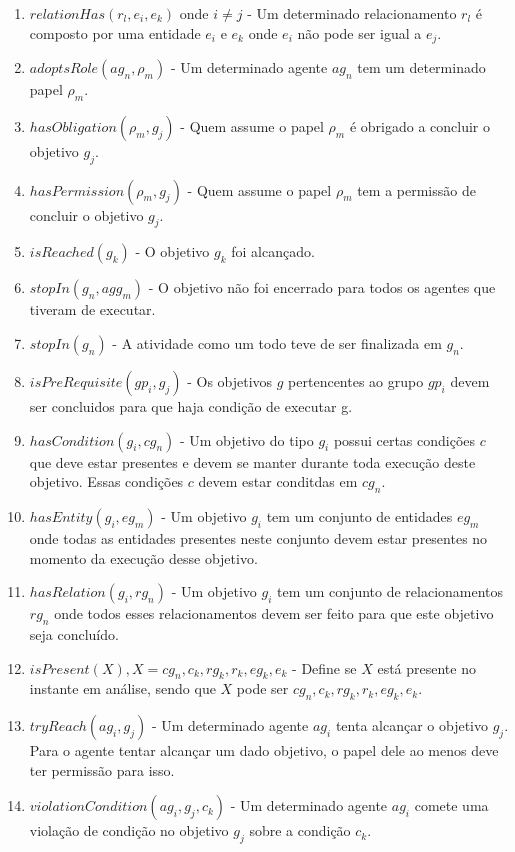 \documentclass[12pt]{article}
\begin{document}
\begin{enumerate}
	\item $relationHas(r_l,e_i,e_k)$ onde $i \neq j$ - Um determinado relacionamento $r_l$ é composto por uma entidade $e_i$ e $e_k$ onde $e_i$ não pode ser igual a $e_j$.	
	\item $adoptsRole(ag_n,\rho_m)$ - Um determinado agente $ag_n$ tem um determinado papel $\rho_m$.
	\item $hasObligation(\rho_m,g_j)$ - Quem assume o papel $\rho_m$ é obrigado a concluir o objetivo $g_j$.
	\item $hasPermission(\rho_m,g_j)$ - Quem assume o papel $\rho_m$ tem a permissão de concluir o objetivo $g_j$.
	\item $isReached(g_k)$ - O objetivo $g_k$ foi alcançado.
	\item $stopIn(g_n,agg_m)$ - O objetivo não foi encerrado para todos os agentes que tiveram de executar. 	 				
	\item $stopIn(g_n)$ - A atividade como um todo teve de ser finalizada em $g_n$.	 			
	\item $isPreRequisite(gp_i,g_j)$ - Os objetivos $g$ pertencentes ao grupo $gp_i$ devem ser concluidos para que haja condição de executar g.
	\item $hasCondition(g_i,cg_n)$ - Um objetivo do tipo $g_i$ possui certas condições $c$ que deve estar presentes e devem se manter durante toda execução deste objetivo. Essas condições $c$ devem estar conditdas em $cg_n$. 
	\item $hasEntity(g_i,eg_m)$ - Um objetivo $g_i$ tem um conjunto de entidades $eg_m$ onde todas as entidades presentes neste conjunto devem estar presentes no momento da execução desse objetivo.
	\item $hasRelation(g_i,rg_n)$ - Um objetivo $g_i$ tem um conjunto de relacionamentos $rg_n$ onde todos esses relacionamentos devem ser feito para que este objetivo seja concluído.
	\item $isPresent(X), X = cg_n,c_k,rg_k,r_k,eg_k,e_k$ - Define se $X$ está presente no instante em análise, sendo que $X$ pode ser $cg_n,c_k,rg_k,r_k,eg_k,e_k$.
	\item $tryReach(ag_i,g_j)$ - Um determinado agente $ag_i$ tenta alcançar o objetivo $g_j$. Para o agente tentar alcançar um dado objetivo, o papel dele ao menos deve ter permissão para isso.  
	\item $violationCondition(ag_i,g_j,c_k)$ - Um determinado agente $ag_i$ comete uma violação de condição no objetivo $g_j$ sobre a condição $c_k$. 

\end{enumerate}
\end{document}
